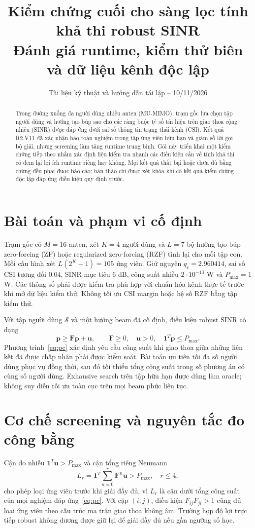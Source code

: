 \documentclass[11pt,onecolumn]{IEEEtran}
\title{Kiểm chứng cuối cho sàng lọc tính khả thi robust SINR\\Đánh giá runtime, kiểm thử biên và dữ liệu kênh độc lập}
\author{Tài liệu kỹ thuật và hướng dẫn tái lập -- 10/11/2026}
\date{}
\begin{document}
\maketitle
\begin{abstract}
Trong đường xuống đa người dùng nhiều anten (MU-MIMO), trạm gốc lựa chọn tập người dùng và hướng tạo búp sao cho các ràng buộc tỷ số tín hiệu trên giao thoa cộng nhiễu (SINR) được đáp ứng dưới sai số thông tin trạng thái kênh (CSI). Kết quả R2.V11 đã xác nhận bảo toàn nghiệm trong tập ứng viên hữu hạn và giảm số lời gọi bộ giải, nhưng screening làm tăng runtime trung bình. Gói này triển khai một kiểm chứng tiếp theo nhằm xác định liệu kiểm tra nhanh các điều kiện cần về tính khả thi có đem lại lợi ích runtime riêng hay không. Mọi kết quả thất bại hoặc chưa đủ bằng chứng đều phải được báo cáo; bản thảo chỉ được xét khóa khi có kết quả kiểm chứng độc lập đáp ứng điều kiện quy định trước.
\end{abstract}

\section{Bài toán và phạm vi cố định}
Trạm gốc có $M=16$ anten, xét $K=4$ người dùng và $L=7$ bộ hướng tạo búp zero-forcing (ZF) hoặc regularized zero-forcing (RZF) tính lại cho mỗi tập con. Mỗi cấu hình xét $L(2^K-1)=105$ ứng viên. Giữ nguyên $q_c=2.960414$, sai số CSI tương đối $0.04$, SINR mục tiêu $6$ dB, công suất nhiễu $2\cdot10^{-13}$ W và $P_{\max}=1$ W. Các thông số phải được kiểm tra phù hợp với chuẩn hóa kênh thực tế trước khi mở dữ liệu kiểm thử. Không tối ưu CSI margin hoặc hệ số RZF bằng tập kiểm thử.

Với tập người dùng $\mathcal S$ và một hướng beam đã cố định, điều kiện robust SINR có dạng
\begin{equation}
\mathbf p\geq \mathbf F\mathbf p+\mathbf u,\qquad \mathbf F\geq0,\quad\mathbf u>0,\quad\mathbf1^T\mathbf p\leq P_{\max}.
\label{eq:pc}
\end{equation}
Phương trình~\eqref{eq:pc} xác định yêu cầu công suất khi giao thoa giữa những liên kết đã được chấp nhận phải được kiểm soát. Bài toán ưu tiên tối đa số người dùng phục vụ đồng thời, sau đó tối thiểu tổng công suất trong số phương án có cùng số người dùng. Exhausive search trên tập hữu hạn được dùng làm oracle; không suy diễn tối ưu toàn cục trên mọi beam phức liên tục.

\section{Cơ chế screening và nguyên tắc đo công bằng}
Cận do nhiễu $\mathbf1^T\mathbf u>P_{\max}$ và cận tổng riêng Neumann
\begin{equation}
L_r=\mathbf1^T\sum_{n=0}^{r}\mathbf F^n\mathbf u>P_{\max},\quad r\leq4,
\label{eq:n}
\end{equation}
cho phép loại ứng viên trước khi giải đầy đủ, vì $L_r$ là cận dưới tổng công suất của mọi nghiệm đáp ứng~\eqref{eq:pc}. Với cặp $(i,j)$, điều kiện $F_{ij}F_{ji}>1$ cũng đủ loại ứng viên theo cấu trúc ma trận giao thoa không âm. Trường hợp độ lợi trực tiếp robust không dương được giữ lại để giải đầy đủ nếu gần ngưỡng số học.
\end{document}
